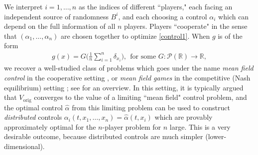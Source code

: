 \documentclass[11pt,reqno]{amsart}
\numberwithin{equation}{section}
\theoremstyle{definition}
\def\R{{\mathbb R}}
\def\P{{\mathcal P}}
\begin{document}
We interpret $i=1,\ldots,n$ as the indices of different ``players," each facing an independent source of randomness $B^i$, and each choosing a control $\alpha_i$ which can depend on the full information of all $n$ players. Players ``cooperate" in the sense that $(\alpha_1,\ldots,\alpha_n)$ are chosen together to optimize \eqref{control1}.
When $g$ is of the form
\begin{align}
	g(x) = G\bigg(\frac{1}{n}\sum_{i=1}^n \delta_{x_i}\bigg), \ \ \text{for some } G : \P(\R)\to\R, \label{control-g=G(emp)}
\end{align}
we recover a well-studied class of problems which goes under the name \emph{mean field control} in the cooperative setting \cite{carmona2015forward}, or \emph{mean field games} in the competitive (Nash equilibrium) setting \cite{huang2006large,lasry2007mean}; see \cite{carmona2018probabilistic} for an overview.
In this setting, it is typically argued that $V_{\mathrm{orig}}$ converges to the value of a limiting ``mean field" control problem, and the optimal control $\widehat\alpha$ from this limiting problem can be used to construct \emph{distributed} controls $\alpha_i(t,x_1,\ldots,x_n) = \widehat\alpha(t,x_i)$ which are provably approximately optimal for the $n$-player problem for $n$ large.
This is a very desirable outcome, because distributed controls are much simpler (lower-dimensional).
\end{document}
